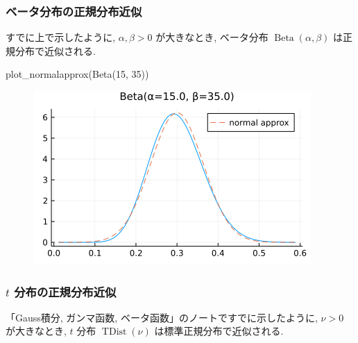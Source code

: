 \documentclass[
  letterpaper,
  DIV=11,
  numbers=noendperiod]{scrartcl}
\newenvironment{Shaded}{\begin{snugshade}}{\end{snugshade}}
\newcommand{\FloatTok}[1]{\textcolor[rgb]{0.68,0.00,0.00}{#1}}
\newcommand{\FunctionTok}[1]{\textcolor[rgb]{0.28,0.35,0.67}{#1}}
\newcommand{\NormalTok}[1]{\textcolor[rgb]{0.00,0.23,0.31}{#1}}
\begin{document}
\hypertarget{ux30d9ux30fcux30bfux5206ux5e03ux306eux6b63ux898fux5206ux5e03ux8fd1ux4f3c}{%
\subsubsection{ベータ分布の正規分布近似}\label{ux30d9ux30fcux30bfux5206ux5e03ux306eux6b63ux898fux5206ux5e03ux8fd1ux4f3c}}

すでに上で示したように, \(\alpha,\beta>0\) が大きなとき, ベータ分布
\(\operatorname{Beta}(\alpha,\beta)\) は正規分布で近似される.

\begin{Shaded}
\begin{Highlighting}[]
\FunctionTok{plot\_normalapprox}\NormalTok{(}\FunctionTok{Beta}\NormalTok{(}\FloatTok{15}\NormalTok{, }\FloatTok{35}\NormalTok{))}
\end{Highlighting}
\end{Shaded}

\begin{figure}[H]

{\centering \includegraphics{05 Central limit theorem_files/figure-pdf/cell-125-output-1.png}

}

\end{figure}

\hypertarget{t-ux5206ux5e03ux306eux6b63ux898fux5206ux5e03ux8fd1ux4f3c}{%
\subsubsection{\texorpdfstring{\(t\)
分布の正規分布近似}{t 分布の正規分布近似}}\label{t-ux5206ux5e03ux306eux6b63ux898fux5206ux5e03ux8fd1ux4f3c}}

「Gauss積分, ガンマ函数, ベータ函数」のノートですでに示したように,
\(\nu>0\) が大きなとき, \(t\) 分布 \(\operatorname{TDist}(\nu)\)
は標準正規分布で近似される.
\end{document}
